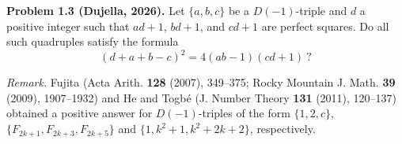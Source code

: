 \textbf{Problem 1.3 (Dujella, 2026).} Let $\{a,b,c\}$ be a $D(-1)$-triple and $d$ a positive integer such that $ad+1$, $bd+1$, and $cd+1$ are perfect squares. Do all such quadruples satisfy the formula
\[
(d+a+b-c)^2 = 4(ab-1)(cd+1)\ ?
\]

\medskip

\textit{Remark.} Fujita (Acta Arith. \textbf{128} (2007), 349--375; Rocky Mountain J. Math. \textbf{39} (2009), 1907--1932) and He and Togbé (J. Number Theory \textbf{131} (2011), 120--137) obtained a positive answer for $D(-1)$-triples of the form $\{1,2,c\}$, $\{F_{2k+1}, F_{2k+3}, F_{2k+5}\}$ and $\{1, k^2+1, k^2+2k+2\}$, respectively.

